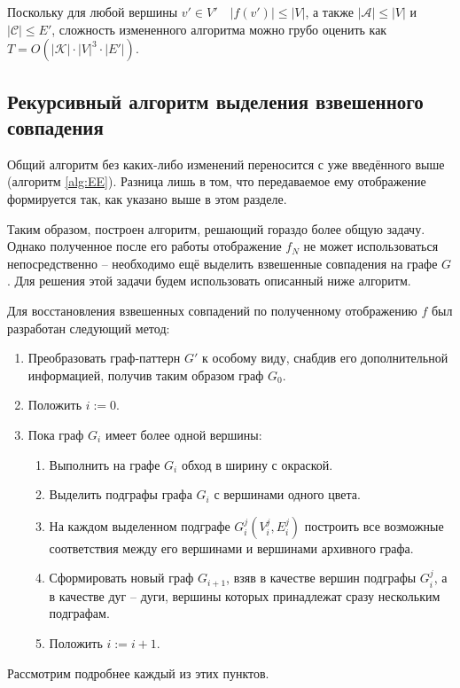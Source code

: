 Поскольку для любой вершины $v' \in V' \quad |f(v')| \le |V|$, а также $|\mathcal{A}| \le |V|$ и $|\mathcal{C}| \le E'$, сложность измененного алгоритма можно грубо оценить как $T = O(|\mathcal{K}| \cdot |V|^3 \cdot |E'|)$.

\subsection{Рекурсивный алгоритм выделения взвешенного совпадения} \label{ssec:recalg}

Общий алгоритм без каких-либо изменений переносится с уже введённого выше (алгоритм \ref{alg:EE}). Разница лишь в том, что передаваемое ему отображение формируется так, как указано выше в этом разделе.

Таким образом, построен алгоритм, решающий гораздо более общую задачу. Однако полученное после его работы отображение $f_N$ не может использоваться непосредственно -- необходимо ещё выделить взвешенные совпадения на графе $G$. Для решения этой задачи будем использовать описанный ниже алгоритм.

Для восстановления взвешенных совпадений по полученному отображению $f$ был разработан следующий метод:

\begin{enumerate}
	\item Преобразовать граф-паттерн $G'$ к особому виду, снабдив его дополнительной информацией, получив таким образом граф $G_0$.
	\item Положить $i := 0$.
	\item Пока граф $G_i$ имеет более одной вершины:
	\begin{enumerate}
		\item Выполнить на графе $G_i$ обход в ширину с окраской.
		\item Выделить подграфы графа $G_i$ с вершинами одного цвета.
		\item На каждом выделенном подграфе $G_i^j(V_i^j, E_i^j)$ построить все возможные соответствия между его вершинами и вершинами архивного графа.
		\item Сформировать новый граф $G_{i+1}$, взяв в качестве вершин подграфы $G_i^j$, а в качестве дуг -- дуги, вершины которых принадлежат сразу нескольким подграфам.
		\item Положить $i := i + 1$.
	\end{enumerate}
\end{enumerate}

Рассмотрим подробнее каждый из этих пунктов.

